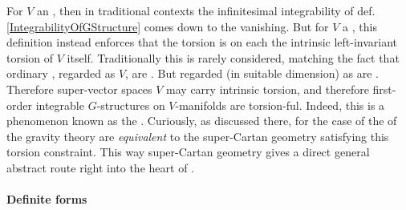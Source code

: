 \begin{remark}
\label{TorsionConstraints}\hypertarget{TorsionConstraints}{}
For $V$ an , then in traditional contexts the infinitesimal integrability of def. \ref{IntegrabilityOfGStructure} comes down to the  vanishing. But for $V$ a , this definition instead enforces that the torsion is on each  the intrinsic left-invariant torsion of $V$ itself.
Traditionally this is rarely considered, matching the fact that ordinary , regarded as  $V$, are . But  regarded (in suitable dimension) as  are . Therefore super-vector spaces $V$ may carry intrinsic torsion, and therefore first-order integrable $G$-structures on $V$-manifolds are torsion-ful.
Indeed, this is a phenomenon known as the . Curiously, as discussed there, for the case of  the  of the gravity theory are \emph{equivalent} to the super-Cartan geometry satisfying this torsion constraint. This way super-Cartan geometry gives a direct general abstract route right into the heart of .
\end{remark}
\hypertarget{definite_forms}{}\paragraph*{{Definite forms}}\label{definite_forms}
